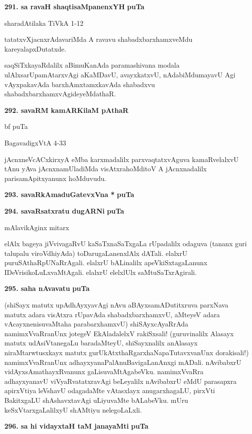 \medskip
\noindent
\textbf{291. sa ravaH shaqtisaMpanenxYH} \hfill {\bf puTa \pageref{151}}

\hfill sharadAtilaka TiVkA 1-12

\smallskip
tatatxvXjacnxrAdavariMda A ravavu shabadxbarxhamxveMdu kareyalapxDutatxde.

saqSiTxkayaRdalilx aBimuKanAda paramashivana modala ulAlxsarUpamAtarx\-vAgi aKaMDavU, avayx\-katxvU, nAdabiMdumayavU Agi vAyxpakavAda barxhAmxtamxka\-vAda shabadxvu shabadxbarxhamxvAgideyeMdathaR.

\noindent
\textbf{292. savaRM kamARKilaM pAthaR} \hfill {bf puTa \pageref{63}

\hfill BagavadigxVtA 4-33

\smallskip
jAcnxneVcACxkirxyA eMba karxmadalilx parxvaqtatxvAguva kamaRvelalxvU tAnu yAva jAcnxnamUladiMda visAtxrahoMditoV A jAcnxnadalilx parisamApitxyanunx hoMduvudu.

\medskip
\noindent
\textbf{293. savaRkAmaduGatevxVna *} \hfill {\bf puTa \pageref{95}}


\noindent
\textbf{294. savaRsatxratu dugARNi} \hfill {\bf puTa \pageref{244}}

\hfill mAlavikAginx mitarx

\smallskip
elAlx bageya jiVvivagaRvU kaSaTxnaSaTxgaLa rUpadalilx odaguva (tananx guri talu\-palu viroVdhi\-yAda) toDarugaLanenxlAlx dATali. elalxrU puruSAthaRpUNaR\-rAgali.  elalxrU bALinalilx apeVkiSxtagaLanunx IDeV\-risi\-koLuLxvaMtAgali. elalxrU elelxlUlx saMtuSaTxrAgirali.

\medskip
\noindent
\textbf{295. saha nAvavatu} \hfill {\bf puTa \pageref{46}}

\smallskip
(shiSayx matutx upAdhAyxyavAgi nAvu aBAyxsamADutitxruva parxNava matutx adara visAtxra rUpa\-vAda shabadxbarxhamxvU, aMteyeV adara vAcayxnenisuvaMtaha para\-barxhamxvU) shiSAyxcAyaRrAda namimxVvaR\-ranUnx jotegeV EkAladalelxV rakiSxsali! (guruvinalilx Alasayx matutx udAsiVtanegaLu baradaMteyU, shiSayx\-nalilx anAlasayx niraMtarwtusxkayx matutx gurUkAtxthaRgarxhaNapaTutavxvanUnx dorakisali!) namimxVvaRranUnx adhayx\-yana\break PalAnuBavigaLanAnxgi mADali. nAvibabxrU vidAyxsAmathayxRvanunx gaLisuvaMtAga\-beVku. namimxV\-vaRra adhayxyanavU viVyaRvatatxravAgi beLeyalilx nAvibabxrU eMdU parasapxra apirxVtiya leVshavU odaga\-daMte vAtasxlayx anugarxhagaLU, pirxVti BakitxgaLU shAshavxtavAgi uLiyuvaMte bALabeVku. mUru keSxVtarx\-gaLa\-lilxyU shAMtiyu nele\-goLaLxli.
 
\noindent
\textbf{296. sa hi vidayxtaH taM janayaMti} \hfill {\bf puTa \pageref{91}}

}
